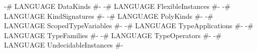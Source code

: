 \begin{code}
{-# LANGUAGE DataKinds            #-}
{-# LANGUAGE FlexibleInstances    #-}
{-# LANGUAGE KindSignatures       #-}
{-# LANGUAGE PolyKinds            #-}
{-# LANGUAGE ScopedTypeVariables  #-}
{-# LANGUAGE TypeApplications     #-}
{-# LANGUAGE TypeFamilies         #-}
{-# LANGUAGE TypeOperators        #-}
{-# LANGUAGE UndecidableInstances #-}
\end{code}
